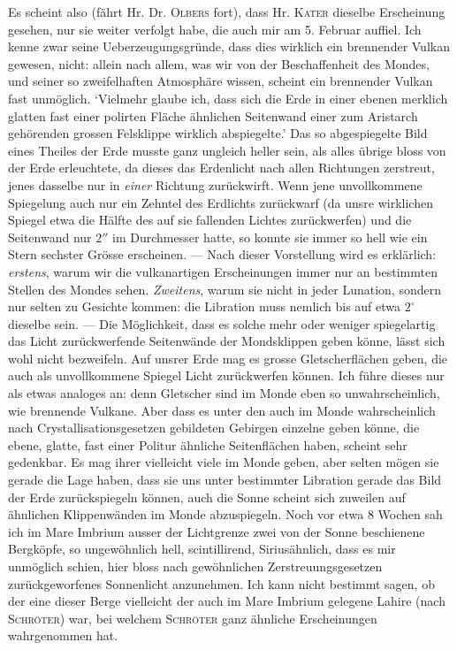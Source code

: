 Es scheint also (fährt Hr. Dr. \textsc{Olbers} fort), dass Hr. \textsc{Kater} dieselbe
Erscheinung gesehen, nur sie weiter verfolgt habe, die auch mir am 5. Februar auffiel.
Ich kenne zwar seine Ueberzeugungsgründe, dass dies wirklich ein brennender Vulkan
gewesen, nicht: allein nach allem, was wir von der Beschaffenheit des Mondes, und seiner
so zweifelhaften Atmosphäre wissen, scheint ein brennender Vulkan fast unmöglich.
`Vielmehr glaube ich, dass sich die Erde in einer ebenen merklich glatten fast einer
polirten Fläche ähnlichen Seitenwand einer zum Aristarch gehörenden grossen Felsklippe
wirklich abspiegelte.' Das so abgespiegelte Bild eines Theiles der Erde musste ganz
ungleich heller sein, als alles übrige bloss von der Erde erleuchtete, da dieses das
Erdenlicht nach allen Richtungen zerstreut, jenes dasselbe nur in \emph{einer} Richtung
zurückwirft. Wenn jene unvollkommene Spiegelung auch nur ein Zehntel des Erdlichts
zurückwarf (da unsre wirklichen Spiegel etwa die Hälfte des auf sie fallenden Lichtes
zurückwerfen) und die Seitenwand nur $2''$ im Durchmesser hatte, so konnte sie immer so
hell wie ein Stern sechster Grösse erscheinen. --- Nach dieser Vorstellung wird es
erklärlich: \emph{erstens}, warum wir die vulkanartigen Erscheinungen immer nur an
bestimmten Stellen des Mondes sehen. \emph{Zweitens}, warum sie nicht in jeder
Lunation, sondern nur selten zu Gesichte kommen: die Libration muss nemlich bis auf etwa
$2^\circ$ dieselbe sein. --- Die Möglichkeit, dass es solche mehr oder weniger
spiegelartig das Licht zurückwerfende Seitenwände der Mondsklippen geben könne, lässt
sich wohl nicht bezweifeln. Auf unsrer Erde mag es grosse Gletscherflächen geben, die
auch als unvollkommene Spiegel Licht zurückwerfen können. Ich führe dieses nur als etwas
analoges an: denn Gletscher sind im Monde eben so
%
unwahrscheinlich, wie brennende Vulkane. Aber dass es unter den auch im Monde wahrscheinlich nach
Crystallisationsgesetzen gebildeten Gebirgen einzelne geben könne, die ebene, glatte, fast einer Politur
ähnliche Seitenflächen haben, scheint sehr gedenkbar. Es mag ihrer vielleicht viele im Monde geben,
aber selten mögen sie gerade die Lage haben, dass sie uns unter bestimmter Libration gerade das Bild
der Erde zurückspiegeln können, auch die Sonne scheint sich zuweilen auf ähnlichen Klippenwänden
im Monde abzuspiegeln. Noch vor etwa 8 Wochen sah ich im Mare Imbrium ausser der Lichtgrenze
zwei von der Sonne beschienene Bergköpfe, so ungewöhnlich hell, scintillirend, Siriusähnlich, dass es
mir unmöglich schien, hier bloss nach gewöhnlichen Zerstreuungsgesetzen zurückgeworfenes Sonnenlicht
anzunehmen. Ich kann nicht bestimmt sagen, ob der eine dieser Berge vielleicht der auch im Mare
Imbrium gelegene Lahire (nach \textsc{Schröter}) war, bei welchem \textsc{Schröter} ganz ähnliche Erscheinungen
wahrgenommen hat.

